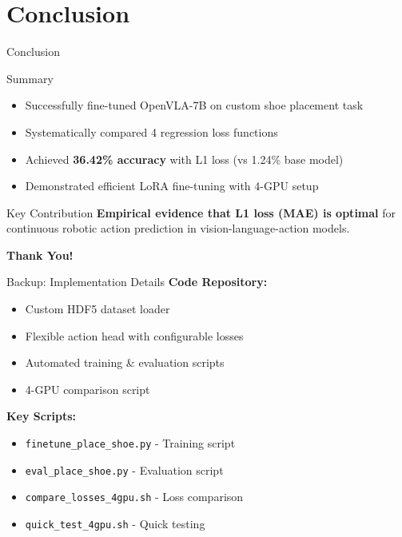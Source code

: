 \documentclass[aspectratio=169]{beamer}
\begin{document}
\section{Conclusion}

\begin{frame}{Conclusion}
\begin{block}{Summary}
\begin{itemize}
    \item Successfully fine-tuned OpenVLA-7B on custom shoe placement task
    \item Systematically compared 4 regression loss functions
    \item Achieved \textbf{36.42\% accuracy} with L1 loss (vs 1.24\% base model)
    \item Demonstrated efficient LoRA fine-tuning with 4-GPU setup
\end{itemize}
\end{block}

\vspace{0.5cm}

\begin{block}{Key Contribution}
\textbf{Empirical evidence that L1 loss (MAE) is optimal} for continuous robotic action prediction in vision-language-action models.
\end{block}

\vspace{0.5cm}
\begin{center}
\Large{\textbf{Thank You!}}
\end{center}
\end{frame}

\appendix

\begin{frame}{Backup: Implementation Details}
\textbf{Code Repository:}
\begin{itemize}
    \item Custom HDF5 dataset loader
    \item Flexible action head with configurable losses
    \item Automated training \& evaluation scripts
    \item 4-GPU comparison script
\end{itemize}

\vspace{0.3cm}
\textbf{Key Scripts:}
\begin{itemize}
    \item \texttt{finetune\_place\_shoe.py} - Training script
    \item \texttt{eval\_place\_shoe.py} - Evaluation script
    \item \texttt{compare\_losses\_4gpu.sh} - Loss comparison
    \item \texttt{quick\_test\_4gpu.sh} - Quick testing
\end{itemize}
\end{frame}
\end{document}
